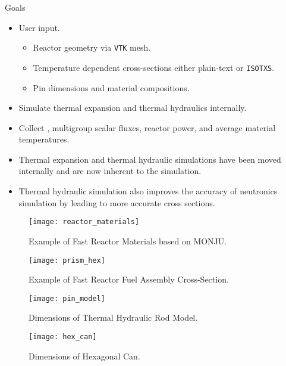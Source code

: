 \begin{frame}{Goals}
  \begin{itemize}
    \item User input.
      \begin{itemize}
        \item Reactor geometry via \texttt{VTK} mesh.
        \item Temperature dependent cross-sections either plain-text or 
          \texttt{ISOTXS}.
        \item Pin dimensions and material compositions.
      \end{itemize}
    \item Simulate thermal expansion and thermal hydraulics internally.
    \item Collect \keff, multigroup scalar fluxes, reactor power, and average
      material temperatures.
  \end{itemize}
  \begin{itemize}
    \item Thermal expansion and thermal hydraulic simulations have been moved
      internally and are now inherent to the simulation.
    \item Thermal hydraulic simulation also improves the accuracy of neutronics
      simulation by leading to more accurate cross sections.
  \end{itemize}
\end{frame}

\begin{frame}
  \begin{figure}
    \centering
    \texttt{[image: reactor\_materials]}
    \caption{Example of Fast Reactor Materials based on MONJU.}
    \label{fig:reactor_materials}
  \end{figure}
\end{frame}

\begin{frame}
  \begin{figure}
    \centering
    \texttt{[image: prism\_hex]}
    \caption{Example of Fast Reactor Fuel Assembly Cross-Section.}
    \label{fig:prism_hex}
  \end{figure}
\end{frame}

\begin{frame}
  \begin{figure}
    \centering
    \texttt{[image: pin\_model]}
    \caption{Dimensions of Thermal Hydraulic Rod Model.}
    \label{fig:pin_model}
  \end{figure}
\end{frame}

\begin{frame}
  \begin{figure}
    \centering
    \texttt{[image: hex\_can]}
    \caption{Dimensions of Hexagonal Can.}
    \label{fig:hex_can}
  \end{figure}
\end{frame}

